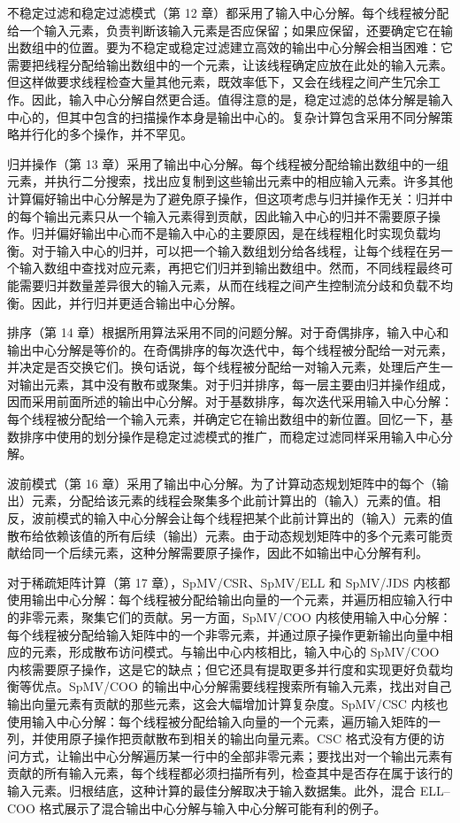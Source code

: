 不稳定过滤和稳定过滤模式（第 12 章）都采用了输入中心分解。每个线程被分配给一个输入元素，负责判断该输入元素是否应保留；如果应保留，还要确定它在输出数组中的位置。要为不稳定或稳定过滤建立高效的输出中心分解会相当困难：它需要把线程分配给输出数组中的一个元素，让该线程确定应放在此处的输入元素。但这样做要求线程检查大量其他元素，既效率低下，又会在线程之间产生冗余工作。因此，输入中心分解自然更合适。值得注意的是，稳定过滤的总体分解是输入中心的，但其中包含的扫描操作本身是输出中心的。复杂计算包含采用不同分解策略并行化的多个操作，并不罕见。

归并操作（第 13 章）采用了输出中心分解。每个线程被分配给输出数组中的一组元素，并执行二分搜索，找出应复制到这些输出元素中的相应输入元素。许多其他计算偏好输出中心分解是为了避免原子操作，但这项考虑与归并操作无关：归并中的每个输出元素只从一个输入元素得到贡献，因此输入中心的归并不需要原子操作。归并偏好输出中心而不是输入中心的主要原因，是在线程粗化时实现负载均衡。对于输入中心的归并，可以把一个输入数组划分给各线程，让每个线程在另一个输入数组中查找对应元素，再把它们归并到输出数组中。然而，不同线程最终可能需要归并数量差异很大的输入元素，从而在线程之间产生控制流分歧和负载不均衡。因此，并行归并更适合输出中心分解。

排序（第 14 章）根据所用算法采用不同的问题分解。对于奇偶排序，输入中心和输出中心分解是等价的。在奇偶排序的每次迭代中，每个线程被分配给一对元素，并决定是否交换它们。换句话说，每个线程被分配给一对输入元素，处理后产生一对输出元素，其中没有散布或聚集。对于归并排序，每一层主要由归并操作组成，因而采用前面所述的输出中心分解。对于基数排序，每次迭代采用输入中心分解：每个线程被分配给一个输入元素，并确定它在输出数组中的新位置。回忆一下，基数排序中使用的划分操作是稳定过滤模式的推广，而稳定过滤同样采用输入中心分解。

波前模式（第 16 章）采用了输出中心分解。为了计算动态规划矩阵中的每个（输出）元素，分配给该元素的线程会聚集多个此前计算出的（输入）元素的值。相反，波前模式的输入中心分解会让每个线程把某个此前计算出的（输入）元素的值散布给依赖该值的所有后续（输出）元素。由于动态规划矩阵中的多个元素可能贡献给同一个后续元素，这种分解需要原子操作，因此不如输出中心分解有利。

对于稀疏矩阵计算（第 17 章），SpMV/CSR、SpMV/ELL 和 SpMV/JDS 内核都使用输出中心分解：每个线程被分配给输出向量的一个元素，并遍历相应输入行中的非零元素，聚集它们的贡献。另一方面，SpMV/COO 内核使用输入中心分解：每个线程被分配给输入矩阵中的一个非零元素，并通过原子操作更新输出向量中相应的元素，形成散布访问模式。与输出中心内核相比，输入中心的 SpMV/COO 内核需要原子操作，这是它的缺点；但它还具有提取更多并行度和实现更好负载均衡等优点。SpMV/COO 的输出中心分解需要线程搜索所有输入元素，找出对自己输出向量元素有贡献的那些元素，这会大幅增加计算复杂度。SpMV/CSC 内核也使用输入中心分解：每个线程被分配给输入向量的一个元素，遍历输入矩阵的一列，并使用原子操作把贡献散布到相关的输出向量元素。CSC 格式没有方便的访问方式，让输出中心分解遍历某一行中的全部非零元素；要找出对一个输出元素有贡献的所有输入元素，每个线程都必须扫描所有列，检查其中是否存在属于该行的输入元素。归根结底，这种计算的最佳分解取决于输入数据集。此外，混合 ELL--COO 格式展示了混合输出中心分解与输入中心分解可能有利的例子。

